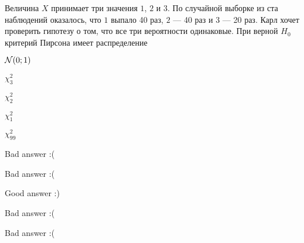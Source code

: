 
\begin{question}
Величина \(X\) принимает три значения \(1\), \(2\) и \(3\). По случайной
выборке из ста наблюдений оказалось, что \(1\) выпало 40 раз, \(2\) ---
40 раз и \(3\) --- 20 раз. Карл хочет проверить гипотезу о том, что все
три вероятности одинаковые. При верной \(H_0\) критерий Пирсона имеет
распределение
\begin{answerlist}
  \item \(\mathcal{N}(0;1)\)
  \item \(\chi^2_3\)
  \item \(\chi^2_2\)
  \item \(\chi^2_1\)
  \item \(\chi^2_{99}\)
\end{answerlist}
\end{question}

\begin{solution}
\begin{answerlist}
  \item Bad answer :(
  \item Bad answer :(
  \item Good answer :)
  \item Bad answer :(
  \item Bad answer :(
\end{answerlist}
\end{solution}

